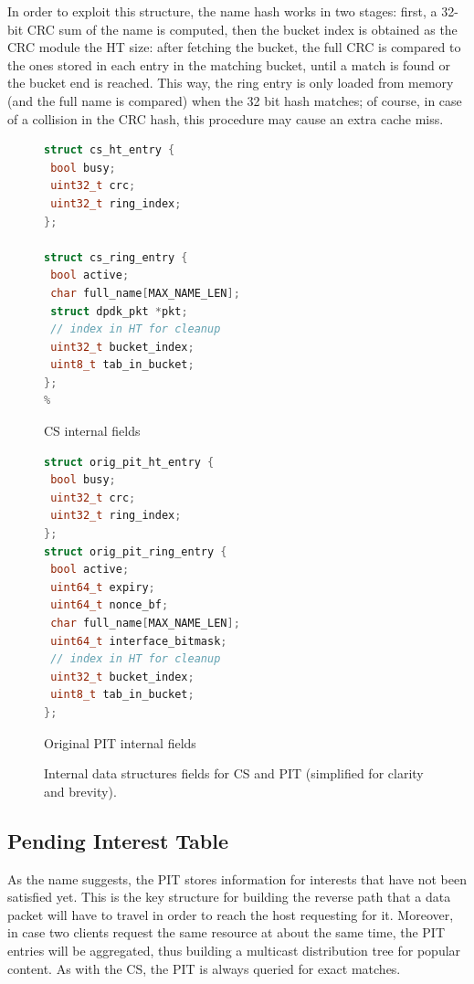 \documentclass[11pt,a4paper,twoside,titlepage,openany]{book}
\begin{document}
In order to exploit this structure, the name hash works in two stages: first, a 32-bit \gls{CRC} sum of the name is computed, then the bucket index is obtained as the CRC module the HT size: after fetching the bucket, the full \gls{CRC} is compared to the ones stored in each entry in the matching bucket, until a match is found or the bucket end is reached. This way, the ring entry is only loaded from memory (and the full name is compared) when the 32 bit hash matches; of course, in case of a collision in the CRC hash, this procedure may cause an extra cache miss.

\begin{figure}[tb]
  \captionsetup{type=lstlisting}
  \begin{sublstlisting}[t]{.5\linewidth}
  \begin{lstlisting}[language=c,escapechar=\%]
struct cs_ht_entry {
 bool busy;
 uint32_t crc;
 uint32_t ring_index;
};

struct cs_ring_entry {
 bool active;
 char full_name[MAX_NAME_LEN];
 struct dpdk_pkt *pkt;
 // index in HT for cleanup
 uint32_t bucket_index;
 uint8_t tab_in_bucket;
};
%
    \end{lstlisting}
    \caption{CS internal fields}\label{lst:augustus.cs}
  \end{sublstlisting}%
  \begin{sublstlisting}[t]{.5\linewidth}
  \begin{lstlisting}[language=c]
struct orig_pit_ht_entry {
 bool busy;
 uint32_t crc;
 uint32_t ring_index;
};
struct orig_pit_ring_entry {
 bool active;
 uint64_t expiry;
 uint64_t nonce_bf;
 char full_name[MAX_NAME_LEN];
 uint64_t interface_bitmask;
 // index in HT for cleanup
 uint32_t bucket_index;
 uint8_t tab_in_bucket;
};
    \end{lstlisting}
    \caption{Original PIT internal fields}\label{lst:augustus.oldpit}
  \end{sublstlisting}
  \caption[CS and original PIT internal data structures fields]{Internal data structures fields for CS and PIT (simplified for clarity and brevity).}\label{lst:augustus.cs_oldpit}
\end{figure}

\subsection{Pending Interest Table}\label{sec:augustus.pit}
As the name suggests, the \gls{PIT} stores information for interests that have not been satisfied yet. This is the key structure for building the reverse path that a data packet will have to travel in order to reach the host requesting for it. Moreover, in case two clients request the same resource at about the same time, the PIT entries will be aggregated, thus building a multicast distribution tree for popular content.
As with the \gls{CS}, the PIT is always queried for exact matches.
\end{document}
